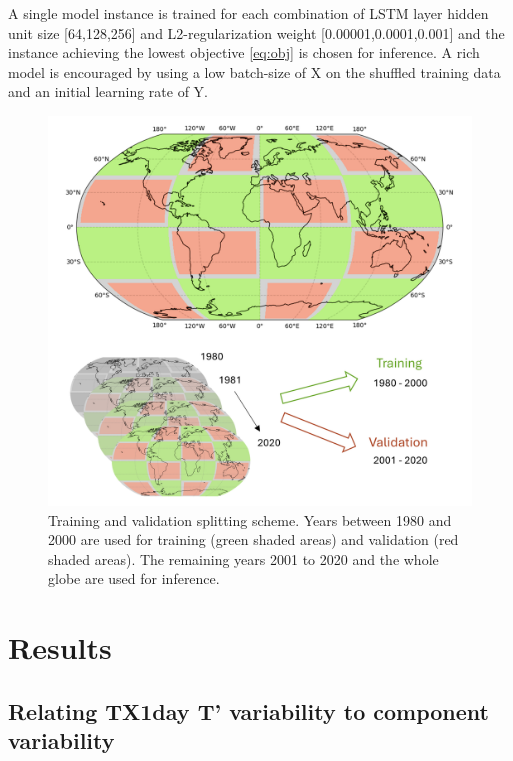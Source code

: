 \documentclass[11pt,a4paper,twoside,openright]{report}
\theoremstyle{definition}
\begin{document}
A single model instance is trained for each combination of LSTM layer hidden unit size {[}64,128,256{]} and L2-regularization weight {[}0.00001,0.0001,0.001{]} and the instance achieving the lowest objective \eqref{eq:obj} is chosen for inference. A rich model is encouraged by using a low batch-size of X on the shuffled training data and an initial learning rate of Y.

\begin{figure}[h]

{\centering \includegraphics[width=0.9\linewidth]{images/test_train_fig} 

}

\caption{Training and validation splitting scheme. Years between 1980 and 2000 are used for training (green shaded areas) and validation (red shaded areas). The remaining years 2001 to 2020 and the whole globe are used for inference.}\label{fig:traintest}
\end{figure}

\chapter{Results}\label{results}

\section{Relating TX1day T' variability to component variability}\label{relating-tx1day-t-variability-to-component-variability}
\end{document}

